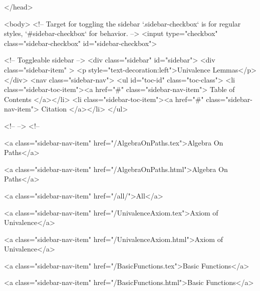   
</head>




  <body>
    <!-- Target for toggling the sidebar `.sidebar-checkbox` is for regular
     styles, `#sidebar-checkbox` for behavior. -->
<input type="checkbox" class="sidebar-checkbox" id="sidebar-checkbox">

<!-- Toggleable sidebar -->
<div class="sidebar" id="sidebar">
  <div class="sidebar-item" >
    <p style="text-decoration:left">Univalence Lemmas</p>
  </div>
  <nav class="sidebar-nav">
    <ul id="toc-id" class="toc-class">
  <li class="sidebar-toc-item"><a href="#" class="sidebar-nav-item"> Table of Contents </a></li>
  <li class="sidebar-toc-item"><a href="#" class="sidebar-nav-item"> Citation </a></li>
</ul>


    <!--  -->
    <!-- 
      
    
      
    
      
    
      
        
      
    
      
        
          <a class="sidebar-nav-item" href="/AlgebraOnPaths.tex">Algebra On Paths</a>
        
      
    
      
        
          <a class="sidebar-nav-item" href="/AlgebraOnPaths.html">Algebra On Paths</a>
        
      
    
      
        
          <a class="sidebar-nav-item" href="/all/">All</a>
        
      
    
      
        
          <a class="sidebar-nav-item" href="/UnivalenceAxiom.tex">Axiom of Univalence</a>
        
      
    
      
        
          <a class="sidebar-nav-item" href="/UnivalenceAxiom.html">Axiom of Univalence</a>
        
      
    
      
        
          <a class="sidebar-nav-item" href="/BasicFunctions.tex">Basic Functions</a>
        
      
    
      
        
          <a class="sidebar-nav-item" href="/BasicFunctions.html">Basic Functions</a>
        
